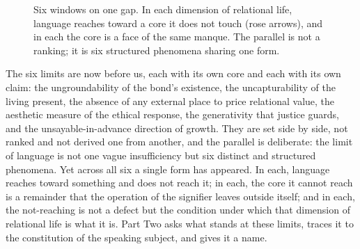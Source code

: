 \begin{figure}[t!]
\centering
{}
\caption{Six windows on one gap. In each dimension of relational life, language reaches toward a core it does not touch (rose arrows), and in each the core is a face of the same manque. The parallel is not a ranking; it is six structured phenomena sharing one form.}
\label{p26:fig:sixwindows}
\end{figure}

\goldrule
\noindent
The six limits are now before us, each with its own core and each with its own claim: the ungroundability of the bond's existence, the uncapturability of the living present, the absence of any external place to price relational value, the aesthetic measure of the ethical response, the generativity that justice guards, and the unsayable-in-advance direction of growth. They are set side by side, not ranked and not derived one from another, and the parallel is deliberate: the limit of language is not one vague insufficiency but six distinct and structured phenomena. Yet across all six a single form has appeared. In each, language reaches toward something and does not reach it; in each, the core it cannot reach is a remainder that the operation of the signifier leaves outside itself; and in each, the not-reaching is not a defect but the condition under which that dimension of relational life is what it is. Part Two asks what stands at these limits, traces it to the constitution of the speaking subject, and gives it a name.
